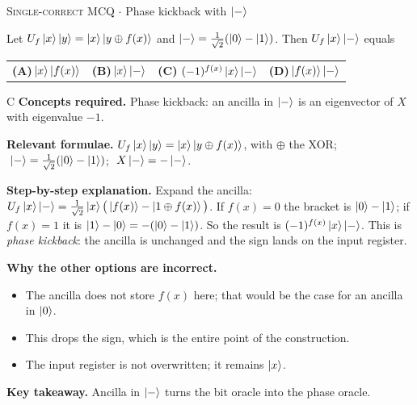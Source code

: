 \documentclass[11pt,a4paper]{article}
\newcommand{\optlabel}[1]{\textbf{(#1)}}
\newcommand{\correctlabel}[1]{\textcolor{okgreen}{\textbf{(#1)}\,\ding{51}}}
\newenvironment{qitem}[1]{\begin{list}{}{\setlength{\leftmargin}{3.3em}\setlength{\labelwidth}{3.1em}%
  \setlength{\labelsep}{0.2em}\setlength{\topsep}{3pt}\setlength{\parsep}{3pt}}\item[\textbf{Q.#1}\hfill]}{\end{list}}
\newcommand{\qsep}{\par\vspace{2pt}{\color{black!15}\hrule}\vspace{4pt}}
\newcommand{\qmeta}[2]{{\footnotesize\color{black!60}\textsc{#1} \;$\cdot$\; #2}\par}
\begin{document}
\begin{qitem}{24}
\qmeta{Single-correct MCQ}{Phase kickback with $\ket{-}$}
Let $U_f\ket{x}\ket{y} = \ket{x}\ket{y \oplus f(x)}$ and $\ket{-} = \frac{1}{\sqrt2}(\ket0 - \ket1)$. Then $U_f\ket{x}\ket{-}$ equals
\par\smallskip\noindent\begin{tabularx}{\linewidth}{@{}*{4}{L}@{}}
\optlabel{A}\,$\ket{x}\ket{f(x)}$ & \optlabel{B}\,$\ket{x}\ket{-}$ & \correctlabel{C}\,$(-1)^{f(x)}\ket{x}\ket{-}$ & \optlabel{D}\,$\ket{f(x)}\ket{-}$
\end{tabularx}
\end{qitem}
\begin{solbox}{C}
\textbf{\color{brand}Concepts required.} Phase kickback: an ancilla in $\ket{-}$ is an eigenvector of $X$ with eigenvalue $-1$.

\textbf{\color{brand}Relevant formulae.} $U_f\ket{x}\ket{y} = \ket{x}\ket{y\oplus f(x)}$, with $\oplus$ the XOR; $\;\ket{-} = \frac{1}{\sqrt2}(\ket0 - \ket1)$; $\;X\ket{-} = -\ket{-}$.

\textbf{\color{brand}Step-by-step explanation.} Expand the ancilla: $U_f\ket{x}\ket{-} = \frac{1}{\sqrt2}\ket{x}\big(\ket{f(x)} - \ket{1 \oplus f(x)}\big)$.
If $f(x) = 0$ the bracket is $\ket0 - \ket1$; if $f(x) = 1$ it is $\ket1 - \ket0 = -(\ket0 - \ket1)$. So the result is $(-1)^{f(x)}\ket{x}\ket{-}$. This is
\emph{phase kickback}: the ancilla is unchanged and the sign lands on the input register.

\textbf{\color{brand}Why the other options are incorrect.}
\begin{itemize}[leftmargin=2.4em, itemsep=1pt, topsep=2pt]
\item[\textbf{(A)}] The ancilla does not store $f(x)$ here; that would be the case for an ancilla in $\ket0$.
\item[\textbf{(B)}] This drops the sign, which is the entire point of the construction.
\item[\textbf{(D)}] The input register is not overwritten; it remains $\ket{x}$.
\end{itemize}
\textbf{\color{brand}Key takeaway.} Ancilla in $\ket{-}$ turns the bit oracle into the phase oracle.
\end{solbox}
\qsep
\end{document}
